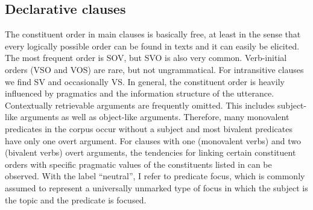 
\subsection{Declarative clauses}
\label{ssec:Declarative clauses}

The constituent order in main clauses is basically free, at least in the sense that every logically possible order can be found in texts and it can easily be elicited. The most frequent order is SOV, but SVO is also very common. Verb-initial orders (VSO and VOS) are rare, but not ungrammatical. For intransitive clauses we find SV and occasionally VS. In general, the constituent order is heavily influenced by pragmatics and the information structure of the utterance. Contextually retrievable arguments are frequently omitted. This includes subject-like arguments as well as object-like arguments. Therefore, many monovalent predicates in the corpus occur without a subject and most bivalent predicates have only one overt argument. For clauses with one (monovalent verbs) and two (bivalent verbs) overt arguments, the tendencies for linking certain constituent orders with specific pragmatic values of the constituents listed in  can be observed. With the label ``neutral'', I refer to predicate focus, which is commonly assumed to represent a universally unmarked type of focus in which the subject is the topic and the predicate is focused.
%
